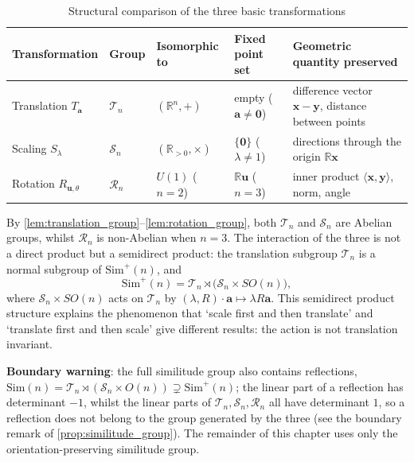\begin{table}[htbp]
    \centering
    \caption{Structural comparison of the three basic transformations}
    \label{tab:transform_summary}
    \renewcommand{\arraystretch}{1.35}
    \setlength{\tabcolsep}{4pt}
    \begin{tabularx}{\textwidth}{@{}>{\raggedright\arraybackslash}p{3.3cm} >{\centering\arraybackslash}p{1.5cm} >{\raggedright\arraybackslash}p{2.8cm} >{\raggedright\arraybackslash}p{2.8cm} >{\raggedright\arraybackslash}X@{}}
        \toprule
        \textbf{Transformation} & \textbf{Group} & \textbf{Isomorphic to} & \textbf{Fixed point set} & \textbf{Geometric quantity preserved} \\
        \midrule
        Translation $T_{\mathbf a}$ & $\mathcal T_n$ & $(\mathbb R^n,+)$ & empty ($\mathbf a\ne\mathbf 0$) & difference vector $\mathbf x-\mathbf y$, distance between points \\
        Scaling $S_\lambda$ & $\mathcal S_n$ & $(\mathbb R_{>0},\times)$ & $\{\mathbf 0\}$ ($\lambda\ne1$) & directions through the origin $\mathbb R\mathbf x$ \\
        Rotation $R_{\mathbf u,\theta}$ & $\mathcal R_n$ & $U(1)$ ($n=2$) & $\mathbb R\mathbf u$ ($n=3$) & inner product $\langle\mathbf x,\mathbf y\rangle$, norm, angle \\
        \bottomrule
    \end{tabularx}
\end{table}

\begin{remark}\label{rem:transform_group_relations}
By \cref{lem:translation_group}--\cref{lem:rotation_group}, both $\mathcal T_n$ and $\mathcal S_n$ are Abelian groups, whilst $\mathcal R_n$ is non-Abelian when $n=3$. The interaction of the three is not a direct product but a semidirect product: the translation subgroup $\mathcal T_n$ is a normal subgroup of $\mathrm{Sim}^{+}(n)$, and
\[
\mathrm{Sim}^{+}(n) = \mathcal T_n \rtimes \bigl(\mathcal S_n \times SO(n)\bigr),
\]
where $\mathcal S_n\times SO(n)$ acts on $\mathcal T_n$ by $(\lambda,R)\cdot\mathbf a \mapsto \lambda R\mathbf a$. This semidirect product structure explains the phenomenon that `scale first and then translate' and `translate first and then scale' give different results: the action is not translation invariant.

\textbf{Boundary warning}: the full similitude group also contains reflections, $\mathrm{Sim}(n)=\mathcal T_n\rtimes(\mathcal S_n\times O(n))\supsetneq\mathrm{Sim}^{+}(n)$; the linear part of a reflection has determinant $-1$, whilst the linear parts of $\mathcal T_n,\mathcal S_n,\mathcal R_n$ all have determinant $1$, so a reflection does not belong to the group generated by the three (see the boundary remark of \cref{prop:similitude_group}). The remainder of this chapter uses only the orientation-preserving similitude group.
\end{remark}

